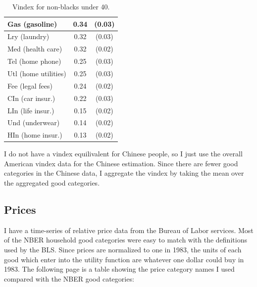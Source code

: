 \documentclass{article}
\begin{document}
\begin{table}
\begin{center}
\begin{tabular}{|l|c|c|}
	\hline
Gas (gasoline) & 0.34 & (0.03)\\ 
	\hline
Lry (laundry) & 0.32 & (0.03)\\ 
	\hline
Med (health care) & 0.32 & (0.02)\\ 
	\hline
Tel (home phone) & 0.25 & (0.03)\\ 
	\hline
Utl (home utilities) & 0.25 & (0.03)\\ 
	\hline
Fee (legal fees) & 0.24 & (0.02)\\ 
	\hline
CIn (car insur.) & 0.22 & (0.03)\\ 
	\hline
LIn (life insur.) & 0.15 & (0.02)\\ 
	\hline
Und (underwear) & 0.14 & (0.02)\\ 
	\hline
HIn (home insur.) & 0.13 & (0.02)\\ 
	\hline
\end{tabular}
\end{center}
\label{tab:vintab}
\caption{Vindex for non-blacks under 40.}
\vspace{-2in}
\end{table}

I do not have a vindex equilivalent for Chinese people, so I just use the overall American vindex data for the Chinese estimation. Since there are fewer good categories in the Chinese data, I aggregate the vindex by taking the mean over the aggregated good categories. 
\subsection{Prices}
I have a time-series of relative price data from the Bureau of Labor services.
Most of the NBER household good categories were easy to match with the definitions used by the BLS.   
Since prices are normalized to one in 1983, the units of each good which enter into the utility function are whatever one dollar could buy in 1983.
The following page is a table showing the price category names I used compared with the NBER good categories:
\end{document}
